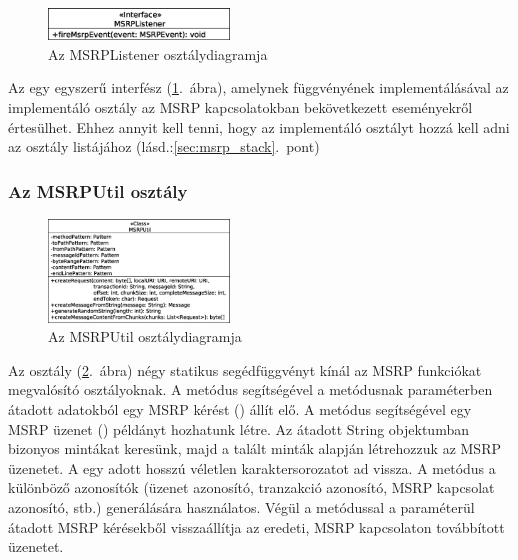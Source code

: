 \begin{figure}
  \vspace{-15pt}
  \begin{center}
    \includegraphics[width=0.43\textwidth]{img/class_diagrams/MSRPListener.eps}
  \end{center}
  \vspace{-15pt}
  \captionsetup{font=scriptsize}
  \caption{Az MSRPListener osztálydiagramja}
   \label{fig:class_listener}
  \vspace{-10pt}
\end{figure}
Az  egy egyszerű interfész (\ref{fig:class_listener}.~ábra), amelynek  függvényének implementálásával az implementáló osztály az MSRP kapcsolatokban bekövetkezett eseményekről értesülhet. Ehhez annyit kell tenni, hogy az implementáló osztályt hozzá kell adni az  osztály  listájához (lásd.:\ref{sec:msrp_stack}.~pont)

\subsubsection*{Az MSRPUtil osztály}
\label{sec:msrp_util}

\begin{figure}
  \vspace{-15pt}
  \begin{center}
    \includegraphics[width=0.43\textwidth]{img/class_diagrams/MSRPUtil.eps}
  \end{center}
  \vspace{-15pt}
  \captionsetup{font=scriptsize}
  \caption{Az MSRPUtil osztálydiagramja}
   \label{fig:class_util}
  \vspace{-10pt}
\end{figure}
Az  osztály (\ref{fig:class_util}.~ábra) négy statikus segédfüggvényt kínál az MSRP funkciókat megvalósító osztályoknak. A  metódus segítségével a metódusnak paraméterben átadott adatokból egy MSRP kérést () állít elő. A  metódus segítségével egy MSRP üzenet () példányt hozhatunk létre. Az átadott String objektumban bizonyos mintákat keresünk, majd a talált minták alapján létrehozzuk az MSRP üzenetet. A  egy adott hosszú véletlen karaktersorozatot ad vissza. A metódus a különböző azonosítók (üzenet azonosító, tranzakció azonosító, MSRP kapcsolat azonosító, stb.) generálására használatos. Végül a  metódussal a paraméterül átadott MSRP kérésekből visszaállítja az eredeti, MSRP kapcsolaton továbbított üzenetet.


